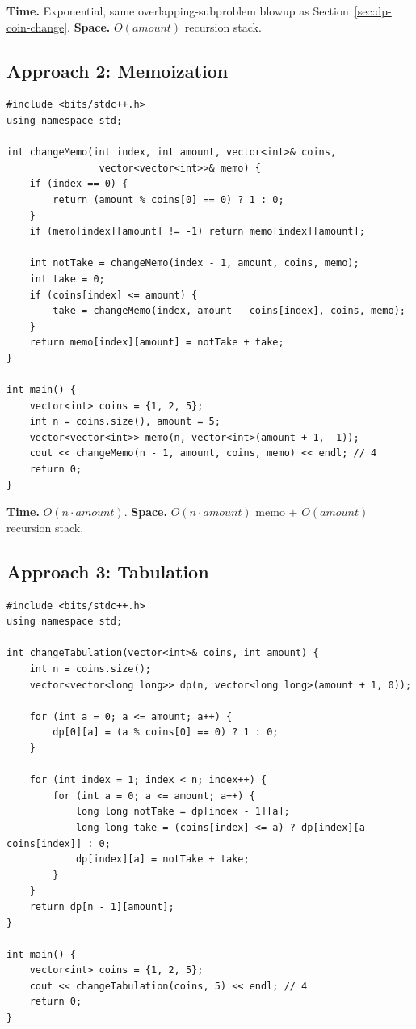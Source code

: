 \begin{complexitybox}
\textbf{Time.} Exponential, same overlapping-subproblem blowup as
Section~\ref{sec:dp-coin-change}.
\textbf{Space.} $O(\textit{amount})$ recursion stack.
\end{complexitybox}

\subsection*{Approach 2: Memoization}

\begin{lstlisting}
#include <bits/stdc++.h>
using namespace std;

int changeMemo(int index, int amount, vector<int>& coins,
                vector<vector<int>>& memo) {
    if (index == 0) {
        return (amount % coins[0] == 0) ? 1 : 0;
    }
    if (memo[index][amount] != -1) return memo[index][amount];

    int notTake = changeMemo(index - 1, amount, coins, memo);
    int take = 0;
    if (coins[index] <= amount) {
        take = changeMemo(index, amount - coins[index], coins, memo);
    }
    return memo[index][amount] = notTake + take;
}

int main() {
    vector<int> coins = {1, 2, 5};
    int n = coins.size(), amount = 5;
    vector<vector<int>> memo(n, vector<int>(amount + 1, -1));
    cout << changeMemo(n - 1, amount, coins, memo) << endl; // 4
    return 0;
}
\end{lstlisting}

\begin{complexitybox}
\textbf{Time.} $O(n \cdot \textit{amount})$.
\textbf{Space.} $O(n \cdot \textit{amount})$ memo $+$
$O(\textit{amount})$ recursion stack.
\end{complexitybox}

\subsection*{Approach 3: Tabulation}

\begin{lstlisting}
#include <bits/stdc++.h>
using namespace std;

int changeTabulation(vector<int>& coins, int amount) {
    int n = coins.size();
    vector<vector<long long>> dp(n, vector<long long>(amount + 1, 0));

    for (int a = 0; a <= amount; a++) {
        dp[0][a] = (a % coins[0] == 0) ? 1 : 0;
    }

    for (int index = 1; index < n; index++) {
        for (int a = 0; a <= amount; a++) {
            long long notTake = dp[index - 1][a];
            long long take = (coins[index] <= a) ? dp[index][a - coins[index]] : 0;
            dp[index][a] = notTake + take;
        }
    }
    return dp[n - 1][amount];
}

int main() {
    vector<int> coins = {1, 2, 5};
    cout << changeTabulation(coins, 5) << endl; // 4
    return 0;
}
\end{lstlisting}


